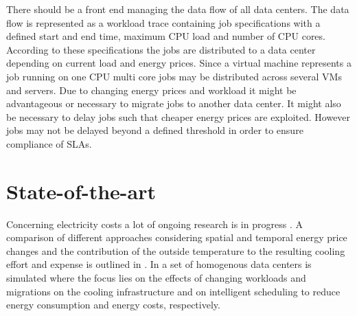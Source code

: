 \documentclass[a4paper]{article}
\begin{document}
There should be a front end managing the data flow of all data centers. The data flow is represented as a workload trace containing job specifications with a defined start and end time, maximum CPU load and number of CPU cores. According to these specifications the jobs are 
distributed to a data center depending on current load and energy prices. Since a virtual machine represents a job running on one CPU multi core jobs may be distributed across several VMs and servers. Due to changing energy prices and workload it might be advantageous or necessary 
to migrate jobs to another data center. It might also be necessary to delay jobs such that cheaper energy prices are exploited. However jobs may not be delayed beyond a defined threshold in order to ensure compliance of SLAs. 



\section{State-of-the-art}

Concerning electricity costs a lot of ongoing research is in progress \cite{guler2013cutting, le2011reducing}. A comparison of different approaches considering spatial and temporal energy price changes and the contribution of the outside temperature to the resulting cooling effort and expense is outlined in \cite{guler2013cutting}. In \cite{le2011reducing} a set of homogenous data centers is simulated where the focus lies on the effects of changing workloads and migrations on the cooling infrastructure and on intelligent scheduling to reduce energy consumption and energy costs, respectively. 

\end{document}
